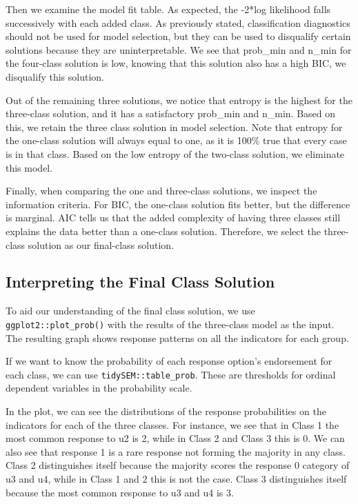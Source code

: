 \documentclass[
  ,man,floatsintext]{apa6}
\begin{document}
Then we examine the model fit table. As expected, the -2*log likelihood
falls successively with each added class. As previously stated,
classification diagnostics should not be used for model selection, but
they can be used to disqualify certain solutions because they are
uninterpretable. We see that prob\_min and n\_min for the four-class solution is
low, knowing that this solution also has a high BIC, we disqualify this
solution.

Out of the remaining three solutions, we notice that entropy is the
highest for the three-class solution, and it has a satisfactory prob\_min
and n\_min. Based on this, we retain the three class solution in model
selection. Note that entropy for the one-class solution will always
equal to one, as it is 100\% true that every case is in that class. Based
on the low entropy of the two-class solution, we eliminate this model.

Finally, when comparing the one and three-class solutions, we inspect
the information criteria. For BIC, the one-class solution fits better,
but the difference is marginal. AIC tells us that the added complexity
of having three classes still explains the data better than a one-class
solution. Therefore, we select the three-class solution as our
final-class solution.

\hypertarget{interpreting-the-final-class-solution}{%
\subsection{Interpreting the Final Class Solution}\label{interpreting-the-final-class-solution}}

To aid our understanding of the final class solution, we use
\texttt{ggplot2::plot\_prob()} with the results of the three-class model as the
input. The resulting graph shows response patterns on all the indicators
for each group.

If we want to know the probability of each response option's endorsement
for each class, we can use \texttt{tidySEM::table\_prob}. These are thresholds
for ordinal dependent variables in the probability scale.

In the plot, we can see the distributions of the response probabilities
on the indicators for each of the three classes. For instance, we see
that in Class 1 the most common response to u2 is 2, while in Class 2
and Class 3 this is 0. We can also see that response 1 is a rare
response not forming the majority in any class. Class 2 distinguishes
itself because the majority scores the response 0 category of u3 and u4,
while in Class 1 and 2 this is not the case. Class 3 distinguishes
itself because the most common response to u3 and u4 is 3.
\end{document}

